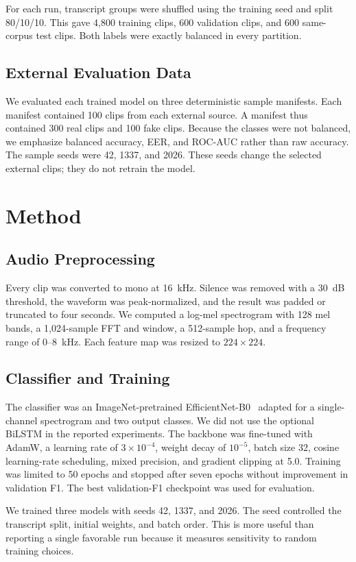 \documentclass[conference]{IEEEtran}
\begin{document}
For each run, transcript groups were shuffled using the training seed and
split 80/10/10. This gave 4,800 training clips, 600 validation clips, and
600 same-corpus test clips. Both labels were exactly balanced in every
partition.

\subsection{External Evaluation Data}
We evaluated each trained model on three deterministic sample manifests.
Each manifest contained 100 clips from each external source. A manifest thus
contained 300 real clips and 100 fake clips. Because the classes were not
balanced, we emphasize balanced accuracy, EER, and ROC-AUC rather than raw
accuracy. The sample seeds were 42, 1337, and 2026. These seeds change the
selected external clips; they do not retrain the model.

\section{Method}
\subsection{Audio Preprocessing}
Every clip was converted to mono at 16~kHz. Silence was removed with a
30~dB threshold, the waveform was peak-normalized, and the result was padded
or truncated to four seconds. We computed a log-mel spectrogram with 128 mel
bands, a 1,024-sample FFT and window, a 512-sample hop, and a frequency range
of 0--8~kHz. Each feature map was resized to $224\times224$.

\subsection{Classifier and Training}
The classifier was an ImageNet-pretrained EfficientNet-B0~\cite{tan2019efficientnet}
adapted for a single-channel spectrogram and two output classes. We did not
use the optional BiLSTM in the reported experiments. The backbone was
fine-tuned with AdamW, a learning rate of $3\times10^{-4}$, weight decay of
$10^{-5}$, batch size 32, cosine learning-rate scheduling, mixed precision,
and gradient clipping at 5.0. Training was limited to 50 epochs and stopped
after seven epochs without improvement in validation F1. The best
validation-F1 checkpoint was used for evaluation.

We trained three models with seeds 42, 1337, and 2026. The seed controlled
the transcript split, initial weights, and batch order. This is more useful
than reporting a single favorable run because it measures sensitivity to
random training choices.
\end{document}
